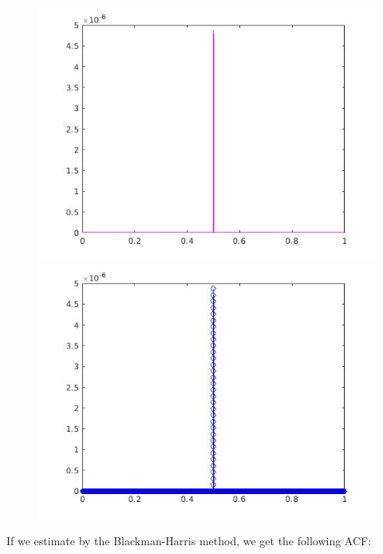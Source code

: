 \documentclass[a4paper,11pt]{article}
\begin{document}
\begin{figure}[!hp]
\centering
\begin{minipage}{.5\textwidth}
  \centering
  \includegraphics[width=1\linewidth]{images/lab2_8.jpg}
\end{minipage}%
\begin{minipage}{.5\textwidth}
  \centering
  \includegraphics[width=1\linewidth]{images/lab2_9.jpg}
\end{minipage}
\end{figure}

\newpage

If we estimate by the Blackman-Harris method, we get the following ACF:
\end{document}
